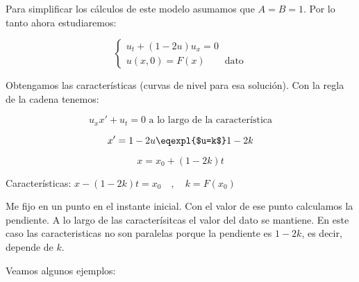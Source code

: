 		Para simplificar los cálculos de este modelo asumamos que $A = B = 1$. Por lo tanto ahora estudiaremos:

		\begin{equation*}
			\left\{
			\begin{array}{l}
				u_t + (1-2u)u_{x} = 0 \\
				u(x, 0) = F(x) \quad \quad \text{dato}
			\end{array}
			\right.
		\end{equation*}

		Obtengamos las características (curvas de nivel para esa solución). Con la regla de la cadena tenemos:

		$$u_x x' + u_t = 0 \text{ a lo largo de la característica}$$

		$$x' = 1 - 2u \eqexpl{$u=k$} 1 - 2k$$

		$$x = x_0 + (1-2k)t$$

		Características:
		\( x - (1-2k)t = x_0\quad,\quad k=F(x_0)  \label{eq:caracteristicas_realistas} \)

		Me fijo en un punto en el instante inicial. Con el valor de ese punto calculamos la pendiente. A lo largo de las caracterísitcas el valor del dato se mantiene. En este caso las caracteristicas no son paralelas porque la pendiente es $1-2k$, es decir, depende de $k$.

		\begin{figure}[!htb]
			\centering
			\caption{}
			\label{fig:rectasDivergentes}
		\end{figure}

		\newpage

		Veamos algunos ejemplos:

